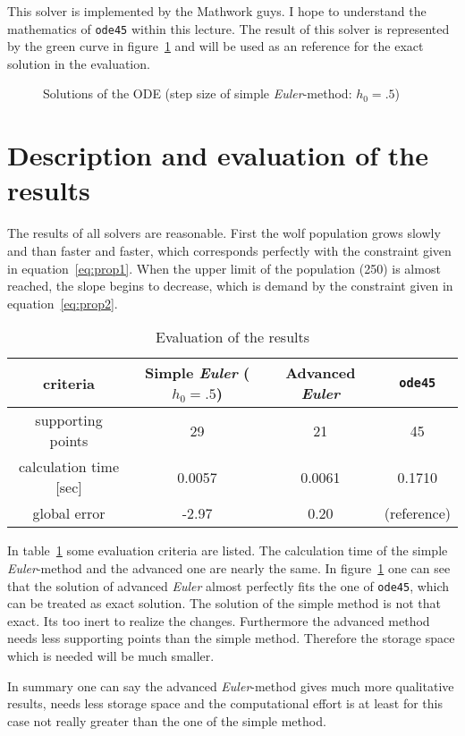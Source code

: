 \documentclass[11pt,a4paper,oneside]{scrartcl}
\begin{document}
This solver is implemented by the Mathwork guys. I hope to understand the mathematics of \texttt{ode45} within this lecture.
The result of this solver is represented by the green curve in figure~\ref{fig:ODEsol} and will be used as an reference for the exact solution in the evaluation.



\begin{figure}

\caption{Solutions of the ODE (step size of simple \textit{Euler}-method: $h_0=.5$)}
\label{fig:ODEsol}
\end{figure}




\section{Description and evaluation of the results}

The results of all solvers are reasonable. First the wolf population grows slowly and than faster and faster, which corresponds perfectly with the constraint given in equation~\ref{eq:prop1}. When the upper limit of the population (250) is almost reached, the slope begins to decrease, which is demand by the constraint given in equation~\ref{eq:prop2}. 

\begin{table}[h]
\centering
\begin{tabular}{c|ccc}
criteria & Simple \textit{Euler} ($h_0=.5$) & Advanced \textit{Euler} & \texttt{ode45} \\
\hline
supporting points & 29 & 21 & 45 \\
calculation time [sec] & 0.0057 & 0.0061 & 0.1710 \\
global error & -2.97  & 0.20 & (reference) 

\end{tabular}

\caption{Evaluation of the results}
\label{tab:eva}
\end{table}

In table~\ref{tab:eva} some evaluation criteria are listed. The calculation time of the simple \textit{Euler}-method and the advanced one are nearly the same. In figure~\ref{fig:ODEsol} one can see that the solution of advanced \textit{Euler} almost perfectly fits the one of \texttt{ode45}, which can be treated as exact solution. The solution of the simple method is not that exact. Its too inert to realize the changes. Furthermore the advanced method needs less supporting points than the simple method. Therefore the storage space which is needed will be much smaller. 

In summary one can say the advanced \textit{Euler}-method gives much more qualitative results, needs less storage space and the computational effort is at least for this case not really greater than the one of the simple method.
\end{document}
